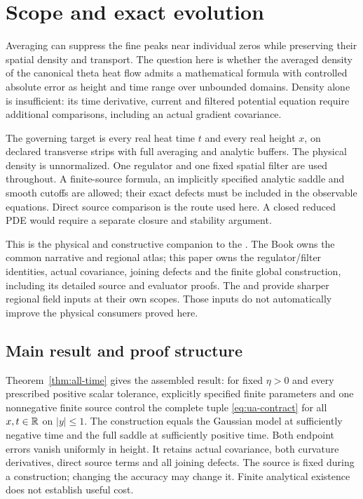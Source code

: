 \section{Scope and exact evolution}\label{sec:framework}
Averaging can suppress the fine peaks near individual zeros while
preserving their spatial density and transport. The question here is
whether the averaged density of the canonical theta heat flow admits a
mathematical formula with controlled absolute error as height and time
range over unbounded domains. Density alone is insufficient: its time
derivative, current and filtered potential equation require additional
comparisons, including an actual gradient covariance.

The governing target is every real heat time $t$ and every real height
$x$, on declared transverse strips with full averaging and analytic
buffers. The physical density is unnormalized. One regulator and one
fixed spatial filter are used throughout. A finite-source formula,
an implicitly specified analytic saddle and smooth cutoffs are allowed;
their exact defects must be included in the observable equations.
Direct source comparison is the route used here. A closed reduced PDE
would require a separate closure and stability argument.

This is the physical and constructive companion to the
. The Book owns the common narrative
and regional atlas; this paper owns the regulator/filter identities,
actual covariance, joining defects and the finite global construction,
including its detailed source and evaluator proofs. The
 and
provide sharper regional field inputs at their own scopes. Those inputs
do not automatically improve the physical consumers proved here.

\subsection{Main result and proof structure}
Theorem~\ref{thm:all-time} gives the assembled result: for fixed
$\eta>0$ and every prescribed positive scalar tolerance, explicitly
specified finite parameters and one nonnegative finite source control
the complete tuple \eqref{eq:ua-contract} for all $x,t\in\mathbb R$ on
$|y|\le1$. The construction equals the Gaussian model at sufficiently
negative time and the full saddle at sufficiently positive time. Both
endpoint errors vanish uniformly in height. It retains actual covariance,
both curvature derivatives, direct source terms and all joining defects.
The source is fixed during a construction; changing the accuracy may
change it. Finite analytical existence does not establish useful cost.

